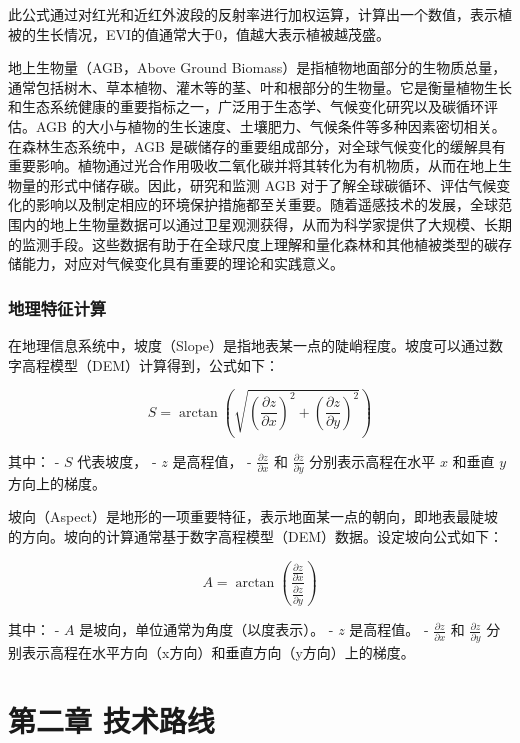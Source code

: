 \documentclass{article}
\begin{document}
		此公式通过对红光和近红外波段的反射率进行加权运算，计算出一个数值，表示植被的生长情况，EVI的值通常大于0，值越大表示植被越茂盛。
		\par
		地上生物量（AGB，Above Ground Biomass）是指植物地面部分的生物质总量，通常包括树木、草本植物、灌木等的茎、叶和根部分的生物量。它是衡量植物生长和生态系统健康的重要指标之一，广泛用于生态学、气候变化研究以及碳循环评估。AGB 的大小与植物的生长速度、土壤肥力、气候条件等多种因素密切相关。在森林生态系统中，AGB 是碳储存的重要组成部分，对全球气候变化的缓解具有重要影响。植物通过光合作用吸收二氧化碳并将其转化为有机物质，从而在地上生物量的形式中储存碳。因此，研究和监测 AGB 对于了解全球碳循环、评估气候变化的影响以及制定相应的环境保护措施都至关重要。随着遥感技术的发展，全球范围内的地上生物量数据可以通过卫星观测获得，从而为科学家提供了大规模、长期的监测手段。这些数据有助于在全球尺度上理解和量化森林和其他植被类型的碳存储能力，对应对气候变化具有重要的理论和实践意义。
		
		
		
		
		
		\subsubsection{地理特征计算}
		
		在地理信息系统中，坡度（Slope）是指地表某一点的陡峭程度。坡度可以通过数字高程模型（DEM）计算得到，公式如下：
		
		\[
		S = \arctan \left( \sqrt{ \left( \frac{\partial z}{\partial x} \right)^2 + \left( \frac{\partial z}{\partial y} \right)^2 } \right)
		\]
		
		其中：
		- \( S \) 代表坡度，
		- \( z \) 是高程值，
		- \( \frac{\partial z}{\partial x} \) 和 \( \frac{\partial z}{\partial y} \) 分别表示高程在水平 \( x \) 和垂直 \( y \) 方向上的梯度。

		
		坡向（Aspect）是地形的一项重要特征，表示地面某一点的朝向，即地表最陡坡的方向。坡向的计算通常基于数字高程模型（DEM）数据。设定坡向公式如下：
		
		\[
		A = \arctan \left( \frac{ \frac{\partial z}{\partial x} }{ \frac{\partial z}{\partial y} } \right)
		\]
		
		其中：
		- \( A \) 是坡向，单位通常为角度（以度表示）。
		- \( z \) 是高程值。
		- \( \frac{\partial z}{\partial x} \) 和 \( \frac{\partial z}{\partial y} \) 分别表示高程在水平方向（x方向）和垂直方向（y方向）上的梯度。
		
		
	\section{第二章 技术路线}
	
\end{document}
